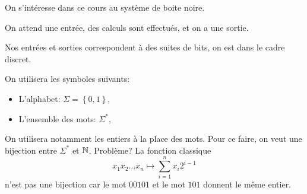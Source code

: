 On s'intéresse dans ce cours au système de boite noire.

On attend une entrée, des calculs sont effectués, et on a une sortie.

\vspace{1em}
\vspace{1em}

Nos entrées et sorties correspondent à des suites de bits,
on est dans le cadre discret.

On utilisera les symboles suivants:
\begin{itemize}
    \item L'alphabet: \(\Sigma = \left\{0,1\right\}\),
    \item L'ensemble des mots: \(\Sigma^*\),
\end{itemize}

On utilisera notamment les entiers à la place des mots. 
Pour ce faire, on veut une bijection entre \(\Sigma^*\) et \(\mathbb{N}\).
Problème? La fonction classique
\begin{equation*}
    x_1x_2\ldots x_n \mapsto \sum_{i=1}^n x_i 2^{i-1}
\end{equation*}
n'est pas une bijection car le mot \(00101\) et le mot \(101\) donnent le même entier.

